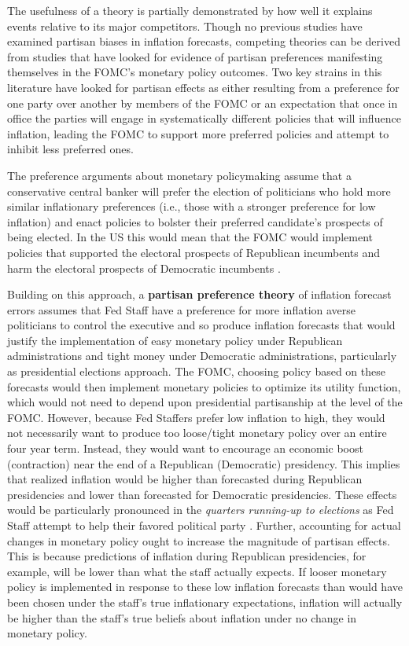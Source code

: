 \documentclass[a4paper]{article}\usepackage{graphicx, color}
\begin{document}

The usefulness of a theory is partially demonstrated by how well it explains events relative to its major competitors. Though no previous studies have examined partisan biases in inflation forecasts, competing theories can be derived from studies that have looked for evidence of partisan preferences manifesting themselves in the FOMC's monetary policy outcomes. Two key strains in this literature have looked for partisan effects as either resulting from a preference for one party over another by members of the FOMC or an expectation that once in office the parties will engage in systematically different policies that will influence inflation, leading the FOMC to support more preferred policies and attempt to inhibit less preferred ones. 

The preference arguments about monetary policymaking assume that a conservative central banker will prefer the election of politicians who hold more similar inflationary preferences (i.e., those with a stronger preference for low inflation) and enact policies to bolster their preferred candidate's prospects of being elected. In the US this would mean that the FOMC would implement policies that supported the electoral prospects of Republican incumbents and harm the electoral prospects of Democratic incumbents \citep{Clark2012,Hakes1988,Sieg1997,Tootell1996}.

Building on this approach, a {\bf{partisan preference theory}} of inflation forecast errors assumes that Fed Staff have a preference for more inflation averse politicians to control the executive and so produce inflation forecasts that would justify the implementation of easy monetary policy under Republican administrations and tight money under Democratic administrations, particularly as presidential elections approach. The FOMC, choosing policy based on these forecasts would then implement monetary policies to optimize its utility function, which would not need to depend upon presidential partisanship at the level of the FOMC. However, because Fed Staffers prefer low inflation to high, they would not necessarily want to produce too loose/tight monetary policy over an entire four year term. Instead, they would want to encourage an economic boost (contraction) near the end of a Republican (Democratic) presidency. This implies that realized inflation would be higher than forecasted during Republican presidencies and lower than forecasted for Democratic presidencies. These effects would be particularly pronounced in the {\emph{quarters running-up to elections}} as Fed Staff attempt to help their favored political party \citep{Beck1987,Grier1987}. Further, accounting for actual changes in monetary policy ought to increase the magnitude of partisan effects. This is because predictions of inflation during Republican presidencies, for example, will be lower than what the staff actually expects. If looser monetary policy is implemented in response to these low inflation forecasts than would have been chosen under the staff's true inflationary expectations, inflation will actually be higher than the staff's true beliefs about inflation under no change in monetary policy.
\end{document}
